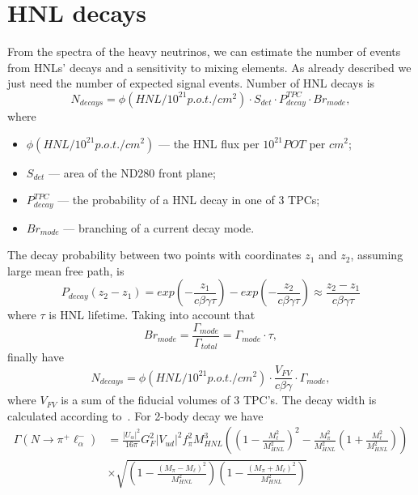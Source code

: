 \documentclass[../main.tex]{subfiles}
\begin{document}
\section{HNL decays}

From the spectra of the heavy neutrinos, we can estimate the number of events from HNLs' decays and a sensitivity to mixing elements. As already described we just need the number of expected signal events. Number of HNL decays is
\begin{equation}
    N_{decays}=\phi(HNL/10^{21}p.o.t./cm^2)\cdot S_{det} \cdot P_{decay}^{TPC}\cdot Br_{mode},
    \label{eq:HNL:Nevents}
\end{equation}
where
\begin{itemize}
    \item $\phi(HNL/10^{21}p.o.t./cm^2)$ --- the HNL flux per $10^{21}POT$ per $cm^2$;
    \item $S_{det}$ --- area of the ND280 front plane;
    \item $P_{decay}^{TPC}$ --- the probability of a HNL decay in one of 3 TPCs;
    \item $Br_{mode}$ --- branching of a current decay mode.
\end{itemize}
The decay probability between two points with coordinates $z_1$ and $z_2$, assuming large mean free path, is
\begin{equation}
    P_{decay}(z_2-z_1)=exp(-\frac{z_1}{c\beta\gamma\tau})-exp(-\frac{z_2}{c\beta\gamma\tau})\approx \frac{z_2-z_1}{c\beta\gamma\tau}
    \label{eq:HNL:Pdecay}
\end{equation}
where $\tau$ is HNL lifetime. Taking into account that
\begin{equation}
    Br_{mode}=\frac{\Gamma_{mode}}{\Gamma_{total}}=\Gamma_{mode}\cdot\tau,
\end{equation}
finally have
\begin{equation}
    N_{decays}=\phi(HNL/10^{21}p.o.t./cm^2)\cdot\frac{V_{FV}}{c\beta\gamma}\cdot\Gamma_{mode},
    \label{eq:HNL:EventsN}
\end{equation}
where $V_{FV}$ is a sum of the fiducial volumes of 3 TPC's. The decay width is calculated according to~\cite{Johnson1997, Gorbunov2007}. For 2-body decay we have
\begin{equation}
    \begin{split}
    \Gamma\left(N\to \pi^+\ell_\alpha^-\right)&=\frac{\left|U_\alpha\right|^2}{16\pi}G_F^2\left|V_{ud}\right|^2f_\pi^2M_{HNL}^3\left(\left(1-\frac{M_\ell^2}{M_{HNL}^2}\right)^2-\frac{M_{\pi}^2}{M_{HNL}^2}\left(1+\frac{M_\ell^2}{M_{HNL}^2}\right)\right)     \\
    &\times \sqrt{\left(1-\frac{\left(M_{\pi}-M_\ell\right)^2}{M_{HNL}^2}\right)\left(1-\frac{\left(M_{\pi}+M_\ell\right)^2}{M_{HNL}^2}\right)}
    \end{split}
\end{equation}
\end{document}
